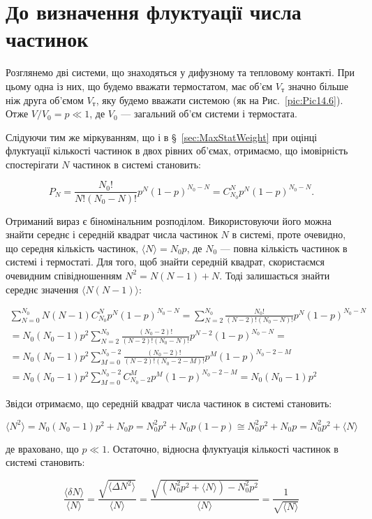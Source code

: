 \section{До визначення флуктуації числа частинок}\label{add:B}

Розглянемо дві системи, що знаходяться у дифузному та тепловому контакті. При цьому одна із них, що будемо вважати термостатом, має об’єм $V_{\text{т}}$ значно більше ніж друга об’ємом $V_\text{т}$, яку будемо вважати системою (як на Рис.~\ref{pic:Pic14.6}). Отже $V / V_0 = p \ll 1$, де $V_0$ --- загальний об’єм системи і термостата.

Слідуючи тим же міркуванням, що і в \S~\ref{sec:MaxStatWeight} при оцінці флуктуації кількості частинок в двох рівних об’ємах, отримаємо, що імовірність спостерігати $N$ частинок в системі становить:

\begin{equation}
	P_N=\frac{N_0!}{N!\left(N_0-N\right)!}p^N\left(1-p\right)^{N_0-N}=C_{N_0}^Np^N\left(1-p\right)^{N_0-N}.
	\label{eq:AppB.1}
\end{equation}

Отриманий вираз є біномінальним розподілом. Використовуючи його можна знайти середнє і середній квадрат числа частинок $N$ в системі, проте очевидно, що середня кількість частинок, $\langle N \rangle  = N_0 p$, де $N_0$ --- повна кількість частинок в системі і термостаті. Для того, щоб знайти середній квадрат, скористаємся очевидним співідношенням $N^2 = N(N - 1) + N$. Тоді залишається знайти середнє значення $\langle N(N - 1) \rangle$:

\begin{multline}
\sum_{N=0}^{N_0} N(N-1)C_{N_0}^N p^N (1-p)^{N_0-N}
= \sum_{N=2}^{N_0} \frac{N_0!}{(N-2)! (N_0-N)!} p^N (1-p)^{N_0-N} \\
= N_0 (N_0 - 1)p^2 \sum_{N=2}^{N_0} \frac{(N_0 - 2)!}{(N-2)! (N_0-N)!} p^{N-2} (1-p)^{N_0-N} = \\
= N_0 (N_0 - 1)p^2 \sum_{M=0}^{N_0-2} \frac{(N_0 - 2)!}{(N-2)! (N_0 - 2-M)!} p^M (1-p)^{N_0-2-M} \\
= N_0 (N_0 - 1)p^2 \sum_{M=0}^{N_0-2} C_{N_0-2}^M p^M (1-p)^{N_0-2-M} = N_0 (N_0 - 1)p^2
	\label{eq:AppB.2}
\end{multline}

Звідси отримаємо, що середній квадрат числа частинок в системі становить:

\begin{equation}
	\langle N^2 \rangle = N_0 (N_0 - 1) p^2 + N_0 p = N_0^2 p^2 + N_0 p (1 - p) \cong N_0^2 p^2 + N_0 p = N_0^2 p^2 + \langle N \rangle
	\label{eq:AppB.3}
\end{equation}

де враховано, що $p \ll 1$. Остаточно, відносна флуктуація кількості частинок в системі становить:

\begin{equation}
	\frac{\langle \delta N \rangle}{\langle N \rangle} = \frac{\sqrt{\langle \Delta N^2 \rangle}}{\langle N \rangle} = \frac{\sqrt{(N_0^2 p^2 + \langle N \rangle) - N_0^2 p^2}}{\langle N \rangle} = \frac{1}{\sqrt{\langle N \rangle}}
	\label{eq:AppB.4}
\end{equation}